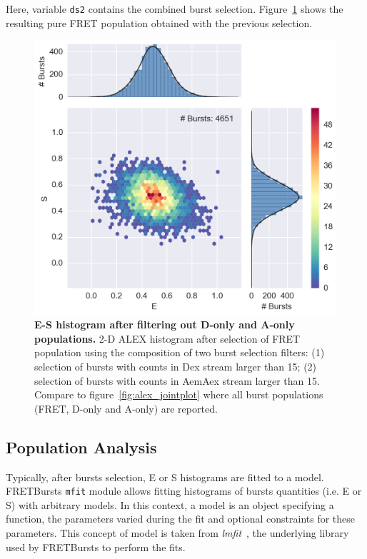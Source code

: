 \documentclass[10pt,letterpaper]{article}
\begin{document}
Here, variable \verb|ds2| contains the combined burst selection.
Figure~\ref{fig:alex_jointplot_fretsel} shows the resulting pure FRET
population obtained with the previous selection.


\begin{figure}[h!]
\begin{center}
\includegraphics[width=0.7\columnwidth]{figures/alex_jointplot_fretsel/alex_jointplot_fretsel}
\caption{\label{fig:alex_jointplot_fretsel}
\textbf{E-S histogram after filtering out D-only and A-only populations.}
2-D ALEX histogram after selection of FRET population 
using the composition of two burst selection filters: 
(1) selection of bursts with counts in Dex stream larger than 15;
(2) selection of bursts with counts in AemAex stream larger than 15.
Compare to figure~\ref{fig:alex_jointplot} where all burst populations 
(FRET, D-only and A-only) are reported.%
}
\end{center}
\end{figure}

\subsection{Population Analysis}
\label{sec:fretfit}

Typically, after bursts selection, E or S histograms are fitted to a model.
FRETBursts \verb|mfit| module allows fitting histograms of bursts quantities
(i.e. E or S) with arbitrary models. In this context, a model is an object
specifying a function, the parameters varied during the fit
and optional constraints for these parameters. This concept of model
is taken from \textit{lmfit}~\cite{lmfit}, the underlying library used by
FRETBursts to perform the fits.
\end{document}
